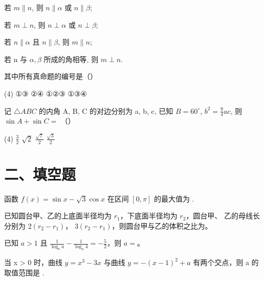 \documentclass[UTF8,12pt]{ctexart}
\newcommand{\blank}{\underline{\hspace{4em}}}   %
\begin{document}
\begin{questions}
    \begin{statements}
      \item[①] 若 $m \parallel n$, 则 $n \parallel \alpha$ 或 $n \parallel \beta$;
      \item[②] 若 $m \perp n$, 则 $n \perp \alpha$ 或 $n \perp \beta$;
      \item[③] 若 $n \parallel \alpha$ 且 $n \parallel \beta$, 则 $m \parallel n$;
      \item[④] 若 n 与 $\alpha, \beta$ 所成的角相等, 则 $m \perp n$.
    \end{statements}

  其中所有真命题的编号是（）

    \begin{tasks}(4)
      \task ①③
      \task ②④
      \task ①②③
      \task ①③④
    \end{tasks}

  \item 记 $\triangle ABC$ 的内角 A, B, C 的对边分别为 a, b, c, 已知 $B = 60^{\circ}$,
    $b^{2} = \frac{9}{4}ac$, 则 $\sin A + \sin C =$ （）

    \begin{tasks}(4)
      \task $\frac{3}{2}$
      \task $\sqrt{2}$
      \task $\frac{\sqrt{7}}{2}$
      \task $\frac{\sqrt{3}}{2}$
    \end{tasks}

\end{questions}

\section*{二、填空题}

\begin{questions}[start=13]

  \item 函数 $f(x) = \sin x - \sqrt{3} \cos x$ 在区间 $[0, \pi]$ 的最大值为 \blank.

  \item 已知圆台甲、乙的上底面半径均为 $r_1$，下底面半径均为 $r_2$，圆台甲、
    乙的母线长分别为 $2(r_2 - r_1)$， $3(r_2 - r_1)$，则圆台甲与乙的体积之比为\blank。

  \item 已知 $a > 1$ 且 $\frac{1}{\log_8 a} - \frac{1}{\log_a 4} = -\frac{5}{2}$，则
    $a =$\blank。

  \item 当 x > 0 时，曲线 $y = x^{3} - 3x$ 与曲线 $y = -(x - 1)^{2} + a$ 有两个交点，则
    a 的取值范围是 \blank.

\end{questions}
\end{document}
